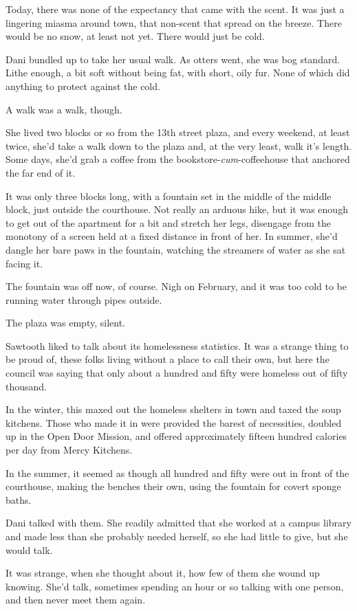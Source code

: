 Today, there was none of the expectancy that came with the scent. It was just a lingering miasma around town, that non-scent that spread on the breeze. There would be no snow, at least not yet. There would just be cold.

Dani bundled up to take her usual walk. As otters went, she was bog standard. Lithe enough, a bit soft without being fat, with short, oily fur. None of which did anything to protect against the cold.

A walk was a walk, though.

She lived two blocks or so from the 13th street plaza, and every weekend, at least twice, she'd take a walk down to the plaza and, at the very least, walk it's length. Some days, she'd grab a coffee from the bookstore-\emph{cum}-coffeehouse that anchored the far end of it.

It was only three blocks long, with a fountain set in the middle of the middle block, just outside the courthouse. Not really an arduous hike, but it was enough to get out of the apartment for a bit and stretch her legs, disengage from the monotony of a screen held at a fixed distance in front of her. In summer, she'd dangle her bare paws in the fountain, watching the streamers of water as she sat facing it.

The fountain was off now, of course. Nigh on February, and it was too cold to be running water through pipes outside.

The plaza was empty, silent.

Sawtooth liked to talk about its homelessness statistics. It was a strange thing to be proud of, these folks living without a place to call their own, but here the council was saying that only about a hundred and fifty were homeless out of fifty thousand.

In the winter, this maxed out the homeless shelters in town and taxed the soup kitchens. Those who made it in were provided the barest of necessities, doubled up in the Open Door Mission, and offered approximately fifteen hundred calories per day from Mercy Kitchens.

In the summer, it seemed as though all hundred and fifty were out in front of the courthouse, making the benches their own, using the fountain for covert sponge baths.

Dani talked with them. She readily admitted that she worked at a campus library and made less than she probably needed herself, so she had little to give, but she would talk.

It was strange, when she thought about it, how few of them she wound up knowing. She'd talk, sometimes spending an hour or so talking with one person, and then never meet them again.

